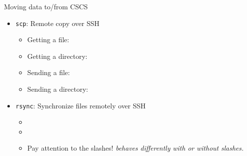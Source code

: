 \begin{frame}{Moving data to/from CSCS}
  \begin{itemize}
  \item \texttt{scp}: Remote copy over SSH
    \begin{itemize}
    \item Getting a file: 
    \item Getting a directory: 
    \item Sending a file: 
    \item Sending a directory: 
    \end{itemize}
  \item \texttt{rsync}: Synchronize files remotely over SSH
    \begin{itemize}
    \item {}
    \item {}
    \item Pay attention to the slashes! \emph{ behaves differently
      with or without slashes.}
    \end{itemize}
  \end{itemize}
\end{frame}
